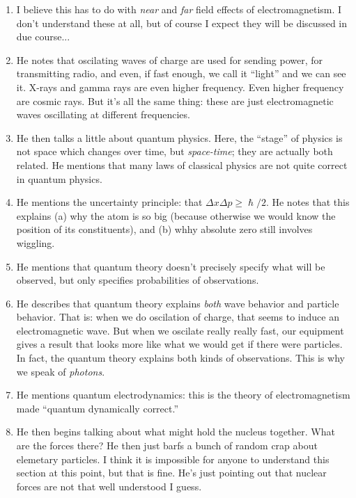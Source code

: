 \begin{enumerate}
  \item I believe this has to do with \emph{near} and \emph{far} field
  effects of electromagnetism. I don't understand these at all, but of
  course I expect they will be discussed in due course...

  \item He notes that oscilating waves of charge are used for sending
  power, for transmitting radio, and even, if fast enough, we call it
  ``light'' and we can see it. X-rays and gamma rays are even higher
  frequency. Even higher frequency are cosmic rays. But it's all the
  same thing: these are just electromagnetic waves oscillating at
  different frequencies.

  \item He then talks a little about quantum physics. Here, the
  ``stage'' of physics is not space which changes over time, but
  \emph{space-time}; they are actually both related. He mentions that
  many laws of classical physics are not quite correct in quantum
  physics.

  \item He mentions the uncertainty principle: that $\Delta x \Delta p
  \geq \hslash/2$. He notes that this explains (a) why the atom is so
  big (because otherwise we would know the position of its
  constituents), and (b) whhy absolute zero still involves wiggling.

  \item He mentions that quantum theory doesn't precisely specify what
  will be observed, but only specifies probabilities of observations.

  \item He describes that quantum theory explains \emph{both} wave
  behavior and particle behavior. That is: when we do oscilation of
  charge, that seems to induce an electromagnetic wave. But when we
  oscilate really really fast, our equipment gives a result that looks
  more like what we would get if there were particles. In fact, the
  quantum theory explains both kinds of observations. This is why we
  speak of \emph{photons}.

  \item He mentions quantum electrodynamics: this is the theory of
  electromagnetism made ``quantum dynamically correct.''

  \item He then begins talking about what might hold the nucleus
  together. What are the forces there? He then just barfs a bunch of
  random crap about elemetary particles. I think it is impossible for
  anyone to understand this section at this point, but that is fine.
  He's just pointing out that nuclear forces are not that well
  understood I guess.
\end{enumerate}
